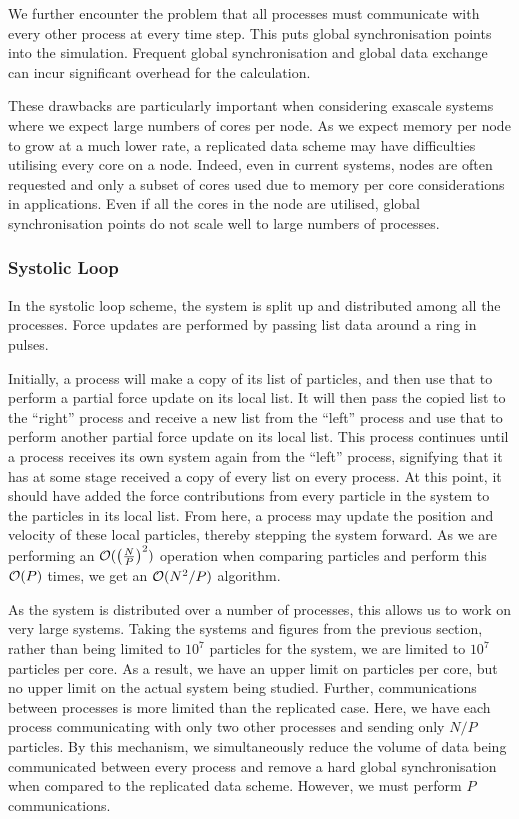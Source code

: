 We further encounter the problem that all processes must communicate
with every other process at every time step.
%
This puts global synchronisation points into the simulation.
%
Frequent global synchronisation and global data exchange can incur
significant overhead for the calculation.

%
These drawbacks are particularly important when considering exascale systems
where we expect large numbers of cores per node.
%
As we expect memory per node to grow at a much lower rate, a replicated data
scheme may have difficulties utilising every core on a node.
%
Indeed, even in current systems, nodes are often requested and only a
subset of cores used due to memory per core considerations in applications.
%
Even if all the cores in the node are utilised, global synchronisation
points do not scale well to large numbers of processes.



\subsubsection{Systolic Loop}

%
In the systolic loop scheme, the system is split up and distributed among
all the processes.
%
Force updates are performed by passing list data around a ring in pulses.

Initially, a process will make a copy of its list of particles,
and then use that to perform a partial force update on its local list.
%
It will then pass the copied list to the ``right'' process and
receive a new list from the ``left'' process and use that to perform
another partial force update on its local list.
%
This process continues until a process receives its own system again from
the ``left'' process, signifying that it has at some stage received
a copy of every list on every process.
%
At this point, it should have added the force contributions from
every particle in the system to the particles in its local list.
%
From here, a process may update the position and velocity of these local
particles, thereby stepping the system forward.
%
As we are performing an $\mathcal{O}{(\left(\frac{N}{P}\right)^2)}$ operation
when comparing particles and perform this $\mathcal{O}{(P)}$ times, we
get an $\mathcal{O}{(N^2/P)}$ algorithm.


%
As the system is distributed over a number of processes, this allows
us to work on very large systems.
%
Taking the systems and figures from the previous section,
rather than being limited to $10^7$ particles for the system,
we are limited to $10^7$ particles per core.
%
As a result, we have an upper limit on particles per core, but no
upper limit on the actual system being studied.
%
Further, communications between processes is more limited than the
replicated case.
%
Here, we have each process communicating with only two other processes
and sending only $N/P$ particles.
%
By this mechanism, we simultaneously reduce the volume of data
being communicated between every process and
remove a hard global synchronisation
when compared to the replicated data scheme.
%
However, we must perform $P$ communications.

